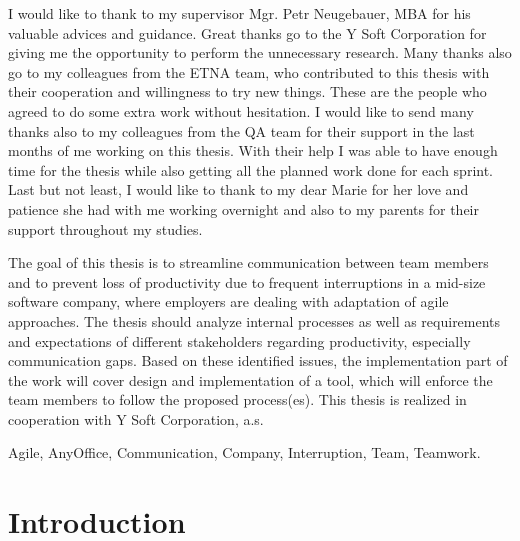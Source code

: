 \documentclass[11pt,singleside]{myfithesis2}
\begin{document}
\FrontMatter
\ThesisTitlePage
\begin{ThesisDeclaration}
\DeclarationText
\AdvisorName
\end{ThesisDeclaration}
\begin{ThesisThanks}
I would like to thank to my supervisor Mgr. Petr Neugebauer, MBA for his valuable advices and guidance. Great thanks go to the Y Soft Corporation for giving me the opportunity to perform the unnecessary research. Many thanks also go to my colleagues from the ETNA team, who contributed to this thesis with their cooperation and willingness to try new things. These are the people who agreed to do some extra work without hesitation. I would like to send many thanks also to my colleagues from the QA team for their support in the last months of me working on this thesis. With their help I was able to have enough time for the thesis while also getting all the planned work done for each sprint. Last but not least, I would like to thank to my dear Marie for her love and patience she had with me working overnight and also to my parents for their support throughout my studies. 
\end{ThesisThanks}
\begin{ThesisAbstract}
The goal of this thesis is to streamline communication between team members and to prevent loss of productivity due to frequent interruptions in a mid-size software company, where employers are dealing with adaptation of agile approaches. The thesis should analyze internal processes as well as requirements and expectations of different stakeholders regarding productivity, especially communication gaps. Based on these identified issues, the implementation part of the work will cover design and implementation of a tool, which will enforce the team members to follow the proposed process(es). This thesis is realized in cooperation with Y Soft Corporation, a.s.
\end{ThesisAbstract}
\begin{ThesisKeyWords}
Agile, AnyOffice, Communication, Company, Interruption, Team, Teamwork.
\end{ThesisKeyWords}
\MainMatter
\tableofcontents %

\chapter{Introduction}
\end{document}
